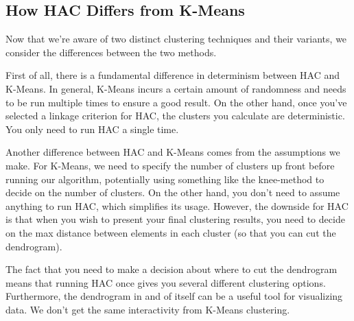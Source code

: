 
\subsection{How HAC Differs from K-Means}
Now that we're aware of two distinct clustering techniques and their variants, we consider the differences between the two methods.

First of all, there is a fundamental difference in determinism between HAC and K-Means. In general, K-Means incurs a certain amount of randomness and needs to be run multiple times to ensure a good result. On the other hand, once you've selected a linkage criterion for HAC, the clusters you calculate are deterministic. You only need to run HAC a single time.

Another difference between HAC and K-Means comes from the assumptions we make. For K-Means, we need to specify the number of clusters up front before running our algorithm, potentially using something like the knee-method to decide on the number of clusters. On the other hand, you don't need to assume anything to run HAC, which simplifies its usage. However, the downside for HAC is that when you wish to present your final clustering results, you need to decide on the max distance between elements in each cluster (so that you can cut the dendrogram).

The fact that you need to make a decision about where to cut the dendrogram means that running HAC once gives you several different clustering options. Furthermore, the dendrogram in and of itself can be a useful tool for visualizing data. We don't get the same interactivity from K-Means clustering.


